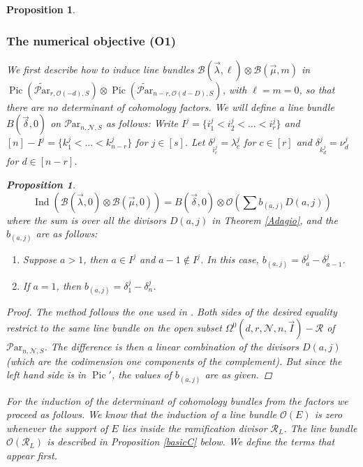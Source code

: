 \documentclass[11pt]{amsart}
\newcommand\op{\operatorname}
\newcommand\Pic{\operatorname{Pic}}
\newcommand\tensor{\otimes}
\newcommand\mn{\mathcal{N}}
\newcommand\Par{\mathcal{P}\text{ar} }
\newtheorem{proposition}[theorem]{Proposition}
\numberwithin{theorem}{subsection}
\begin{document}
{\begin{proposition}
\subsubsection{The numerical objective (O1)}
We first describe how to induce line bundles $\mathcal{B}(\vec{\lambda},\ell)\tensor\mathcal{B}(\vec{\mu},m)$ in $\Pic (\widetilde{\Par}_{r,\mathcal{O}(-d),S})\tensor  \Pic (\widetilde{\Par}_{n-r,\mathcal{O}(d-D),S})$, with $\ell=m=0$, so that there are no determinant of cohomology factors.
We will define a line bundle $B(\vec{\delta},0)$ on $\Par_{n,\mathcal{N},S}$ as follows: Write
$I^j=\{i^j_1<i^j_2<\dots < i^j_r\}$ and $[n]-I^j=\{k^j_1<\dots < k^j_{n-r}\}$ for $j\in[s]$. Let $\delta^j_{i^j_c} =\lambda^j_c$ for $c\in [r]$ and $\delta^j_{k^j_d} =\nu^j_d$ for $d\in [n-r]$.

\begin{proposition}\label{formInd}
$$\op{Ind}(\mathcal{B}(\vec{\lambda},0)\tensor\mathcal{B}(\vec{\mu},0)) = B(\vec{\delta},0)\tensor\mathcal{O}(\sum b_{(a,j)}D(a,j))$$
where the sum is over all the divisors $D(a,j)$ in Theorem \ref{Adagio}, and the $b_{(a,j)}$ are as follows:
\begin{enumerate}
\item Suppose $a>1$, then $a\in I^j$ and $a-1\not\in I^j$. In this case, $b_{(a,j)}= \delta^j_{a}-\delta^j_{a-1}$.
\item If $a=1$, then $b_{(a,j)}= \delta^j_{1}-\delta^j_{n}$.
\end{enumerate}
\end{proposition}
\begin{proof}
The method follows the one used in \cite{BKiers}. Both sides of the desired equality restrict to the same line bundle on the open subset ${\Omega}^0(d,r,\mn,n,\vec{I})-\mathcal{R}$ of $\Par_{n,\mathcal{N},S}$. The difference is then a linear combination of the divisors $D(a,j)$ (which are the codimension one components of the complement). But since the left hand side is in $\Pic'$, the values of $b_{(a,j)}$ are as given.
\end{proof}




For the induction of the determinant of cohomology bundles from the factors we proceed as follows.
We know that the induction of  a line bundle $\mathcal{O}(E)$ is zero whenever the support of $E$  lies inside the ramification divisor $\mathcal{R}_L$. The line bundle $\mathcal{O}(\mathcal{R}_L)$ is described in Proposition \ref{basicC} below. We define the terms that appear first.


\end{proposition}}
\end{document}
